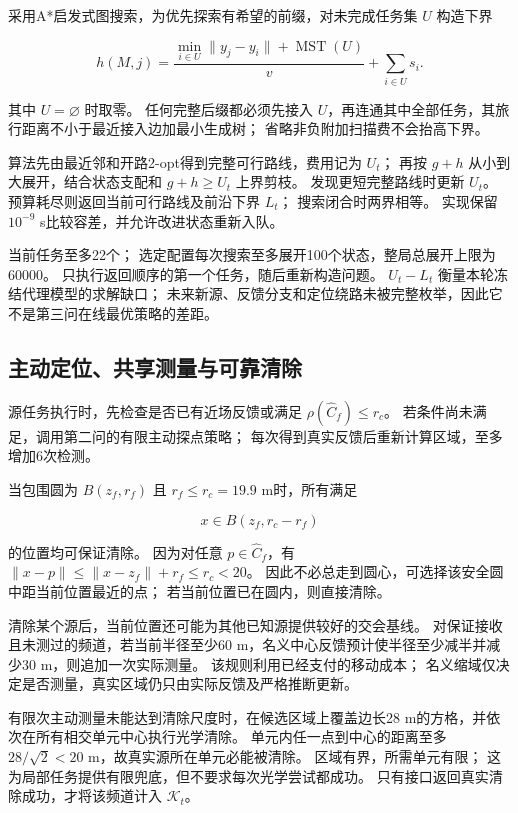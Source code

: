 采用A*启发式图搜索\cite{hart1968}，为优先探索有希望的前缀，对未完成任务集 \(U\) 构造下界

\begin{equation}\label{eq:q3-10}
h(M,j)=\frac{\min_{i\in U}\|y_j-y_i\|+\operatorname{MST}(U)}{v}
+\sum_{i\in U}s_i.
\end{equation}

其中 \(U=\varnothing\) 时取零。
任何完整后缀都必须先接入 \(U\)，再连通其中全部任务，其旅行距离不小于最近接入边加最小生成树；
省略非负附加扫描费不会抬高下界。

算法先由最近邻和开路2-opt得到完整可行路线，费用记为 \(U_t\)；
再按 \(g+h\) 从小到大展开，结合状态支配和 \(g+h\ge U_t\) 上界剪枝。
发现更短完整路线时更新 \(U_t\)。
预算耗尽则返回当前可行路线及前沿下界 \(L_t\)；
搜索闭合时两界相等。
实现保留 \(10^{-9}\) s比较容差，并允许改进状态重新入队。

当前任务至多22个；
选定配置每次搜索至多展开100个状态，整局总展开上限为60000。
只执行返回顺序的第一个任务，随后重新构造问题。
\(U_t-L_t\) 衡量本轮冻结代理模型的求解缺口；
未来新源、反馈分支和定位绕路未被完整枚举，因此它不是第三问在线最优策略的差距。

\subsection{主动定位、共享测量与可靠清除}\label{sec:q3-4}

源任务执行时，先检查是否已有近场反馈或满足 \(\rho(\widehat C_f)\le r_c\)。
若条件尚未满足，调用第二问的有限主动探点策略；
每次得到真实反馈后重新计算区域，至多增加6次检测。

当包围圆为 \(B(z_f,r_f)\) 且 \(r_f\le r_c=19.9\) m时，所有满足

\begin{equation}\label{eq:q3-11}
x\in B(z_f,r_c-r_f)
\end{equation}

的位置均可保证清除。
因为对任意 \(p\in\widehat C_f\)，有 \(\|x-p\|\le\|x-z_f\|+r_f\le r_c<20\)。
因此不必总走到圆心，可选择该安全圆中距当前位置最近的点；
若当前位置已在圆内，则直接清除。

清除某个源后，当前位置还可能为其他已知源提供较好的交会基线。
对保证接收且未测过的频道，若当前半径至少60 m，名义中心反馈预计使半径至少减半并减少30 m，则追加一次实际测量。
该规则利用已经支付的移动成本；
名义缩域仅决定是否测量，真实区域仍只由实际反馈及严格推断更新。

有限次主动测量未能达到清除尺度时，在候选区域上覆盖边长28 m的方格，并依次在所有相交单元中心执行光学清除。
单元内任一点到中心的距离至多 \(28/\sqrt2<20\) m，故真实源所在单元必能被清除。
区域有界，所需单元有限；
这为局部任务提供有限兜底，但不要求每次光学尝试都成功。
只有接口返回真实清除成功，才将该频道计入 \(\mathcal K_t\)。


